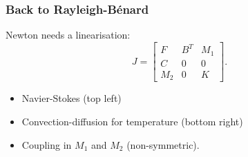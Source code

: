 \documentclass[presentation]{beamer}
\begin{document}
\begin{frame}
  \frametitle{Back to Rayleigh-B\'enard}
  Newton needs a linearisation:
  \begin{equation*}
    J = \begin{bmatrix}
      F   & B^T & M_1 \\
      C   & 0   & 0   \\
      M_2 & 0   & K
    \end{bmatrix}.
  \end{equation*}
  \begin{itemize}
  \item Navier-Stokes (top left)
  \item Convection-diffusion for temperature (bottom right)
  \item Coupling in $M_1$ and $M_2$ (non-symmetric).
  \end{itemize}
\end{frame}
\end{document}
